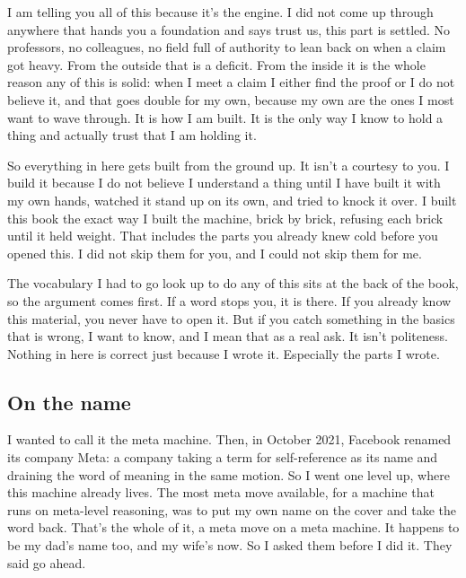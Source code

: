 \documentclass[11pt,twoside]{article}
\theoremstyle{thielethm}
\theoremstyle{thieledef}
\theoremstyle{thieledef}
\theoremstyle{thieledef}
\theoremstyle{thielethm}
\theoremstyle{thieleobs}
\theoremstyle{thielethm}
\begin{document}
I am telling you all of this because it's the engine. I did not come up through anywhere that hands you a foundation and says trust us, this part is settled. No professors, no colleagues, no field full of authority to lean back on when a claim got heavy. From the outside that is a deficit. From the inside it is the whole reason any of this is solid: when I meet a claim I either find the proof or I do not believe it, and that goes double for my own, because my own are the ones I most want to wave through. It is how I am built. It is the only way I know to hold a thing and actually trust that I am holding it.

So everything in here gets built from the ground up. It isn't a courtesy to you. I build it because I do not believe I understand a thing until I have built it with my own hands, watched it stand up on its own, and tried to knock it over. I built this book the exact way I built the machine, brick by brick, refusing each brick until it held weight. That includes the parts you already knew cold before you opened this. I did not skip them for you, and I could not skip them for me.

The vocabulary I had to go look up to do any of this sits at the back of the book, so the argument comes first. If a word stops you, it is there. If you already know this material, you never have to open it. But if you catch something in the basics that is wrong, I want to know, and I mean that as a real ask. It isn't politeness. Nothing in here is correct just because I wrote it. Especially the parts I wrote.

\subsection*{On the name}

I wanted to call it the meta machine. Then, in October 2021, Facebook renamed its company Meta: a company taking a term for self-reference as its name and draining the word of meaning in the same motion. So I went one level up, where this machine already lives. The most meta move available, for a machine that runs on meta-level reasoning, was to put my own name on the cover and take the word back. That's the whole of it, a meta move on a meta machine. It happens to be my dad's name too, and my wife's now. So I asked them before I did it. They said go ahead.

\appendix
\end{document}
